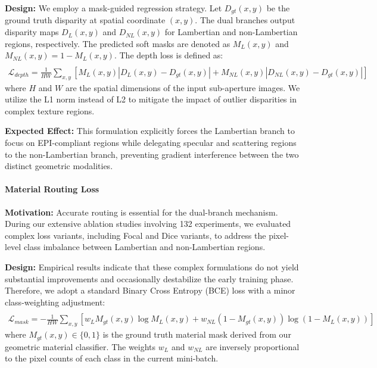 \documentclass[lettersize,journal]{IEEEtran}
\begin{document}
\textbf{Design:} We employ a mask-guided regression strategy. Let $D_{gt}(x,y)$ be the ground truth disparity at spatial coordinate $(x,y)$. The dual branches output disparity maps $D_{L}(x,y)$ and $D_{NL}(x,y)$ for Lambertian and non-Lambertian regions, respectively. The predicted soft masks are denoted as $M_{L}(x,y)$ and $M_{NL}(x,y) = 1 - M_{L}(x,y)$. The depth loss is defined as:
\begin{multline}
 \\
\mathcal{L}_{depth} = \frac{1}{HW} \sum_{x,y} \left[ M_{L}(x,y) \left| D_{L}(x,y) - D_{gt}(x,y) \right| + M_{NL}(x,y) \left| D_{NL}(x,y) - D_{gt}(x,y) \right| \right]
\label{eq:ch3_24}
\end{multline}
where $H$ and $W$ are the spatial dimensions of the input sub-aperture images. We utilize the L1 norm instead of L2 to mitigate the impact of outlier disparities in complex texture regions.

\textbf{Expected Effect:} This formulation explicitly forces the Lambertian branch to focus on EPI-compliant regions while delegating specular and scattering regions to the non-Lambertian branch, preventing gradient interference between the two distinct geometric modalities.

\paragraph{Material Routing Loss}
\textbf{Motivation:} Accurate routing is essential for the dual-branch mechanism. During our extensive ablation studies involving 132 experiments, we evaluated complex loss variants, including Focal and Dice variants, to address the pixel-level class imbalance between Lambertian and non-Lambertian regions.

\textbf{Design:} Empirical results indicate that these complex formulations do not yield substantial improvements and occasionally destabilize the early training phase. Therefore, we adopt a standard Binary Cross Entropy (BCE) loss with a minor class-weighting adjustment:
\begin{multline}
 \\
\mathcal{L}_{mask} = -\frac{1}{HW} \sum_{x,y} \left[ w_{L} M_{gt}(x,y) \log M_{L}(x,y) + w_{NL} (1 - M_{gt}(x,y)) \log (1 - M_{L}(x,y)) \right]
\label{eq:ch3_25}
\end{multline}
where $M_{gt}(x,y) \in \{0, 1\}$ is the ground truth material mask derived from our geometric material classifier. The weights $w_{L}$ and $w_{NL}$ are inversely proportional to the pixel counts of each class in the current mini-batch.
\end{document}
